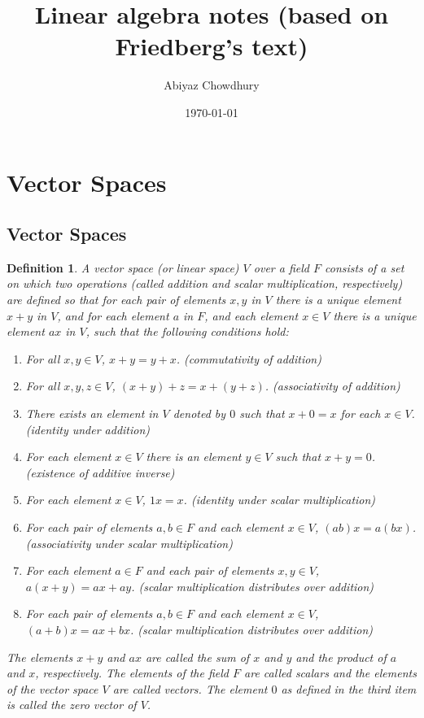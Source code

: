 \documentclass[a4paper]{article}
\title{\textbf{Linear algebra notes (based on Friedberg's text)}}
\author{Abiyaz Chowdhury }
\date{\today}
\newtheorem{mydef}{Definition}
\numberwithin{mytheorem}{section}
\numberwithin{mydef}{section}
\numberwithin{example}{section}
\begin{document}
\maketitle

\section{Vector Spaces}

\subsection{Vector Spaces}

\begin{mydef} A vector space (or linear space) $V$ over a field $F$ consists of a set on which two operations (called addition and scalar multiplication, respectively) are defined so that for each pair of elements $x,y$ in $V$ there is a unique element $x + y$ in $V$, and for each element $a$ in $F$, and each element $x \in V$ there  is a unique element $ax$ in $V$, such that the following conditions hold:
\begin{enumerate}
\item For all $x,y \in V$, $x + y = y + x$. (commutativity of addition)
\item For all $x,y,z \in V$, $(x + y) + z = x + (y+z)$. (associativity of addition)
\item There exists an element in $V$ denoted by $0$ such that $x + 0 = x$ for each $x \in V$. (identity under addition)
\item For each element $x \in V$ there is an element $y \in V$ such that $x + y = 0$. (existence of additive inverse)
\item For each element $x \in V$, $1x = x$. (identity under scalar multiplication)
\item For each pair of elements $a,b \in F$ and  each element $x \in V$, $(ab)x = a(bx)$. (associativity under scalar multiplication) 
\item For each element $a \in F$ and each pair of elements $x,y \in V$, $a(x + y) = ax + ay$. (scalar multiplication distributes over addition)
\item For each pair of elements $a, b \in F$ and each element $x \in V$, $(a+b)x = ax + bx$. (scalar multiplication distributes over addition)
\end{enumerate}
The elements $x+y$ and $ax$ are called the sum of $x$ and $y$ and the product of $a$ and $x$, respectively. The elements of the field $F$ are called scalars and the elements of the vector space $V$ are called vectors. The element $0$ as defined in the third item is called the zero vector of $V$.
\end{mydef}
\end{document}
